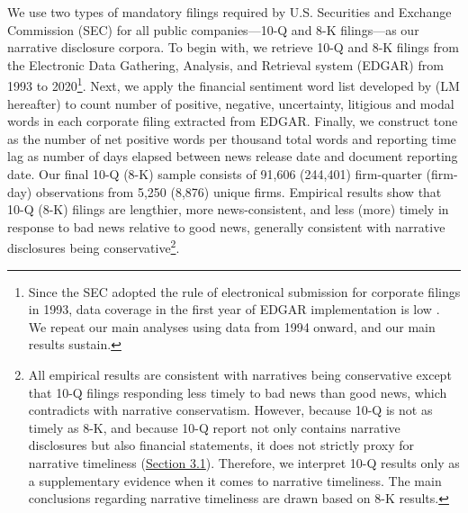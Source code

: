 \documentclass[a4paper]{article}
\begin{document}
\begin{spacing}{2}
We use two types of mandatory filings required by U.S. Securities and Exchange Commission (SEC) for all public companies---10-Q and 8-K filings---as our narrative disclosure corpora. To begin with, we retrieve 10-Q and 8-K filings from the Electronic Data Gathering, Analysis, and Retrieval system (EDGAR) from 1993 to 2020\footnote{Since the SEC adopted the rule of electronical submission for corporate filings in 1993, data coverage in the first year of EDGAR implementation is low \citep*{gaoInformingMarketEffect2020}. We repeat our main analyses using data from 1994 onward, and our main results sustain.}. Next, we apply the financial sentiment word list developed by \citet*{loughranWhenLiabilityNot2011} (LM hereafter) to count number of positive, negative, uncertainty, litigious and modal words in each corporate filing extracted from EDGAR. Finally, we construct tone as the number of net positive words per thousand total words and reporting time lag as number of days elapsed between news release date and document reporting date. Our final 10-Q (8-K) sample consists of 91,606 (244,401) firm-quarter (firm-day) observations from 5,250 (8,876) unique firms. Empirical results show that 10-Q (8-K) filings are lengthier, more news-consistent, and less (more) timely in response to bad news relative to good news, generally consistent with narrative disclosures being conservative\footnote{All empirical results are consistent with narratives being conservative except that 10-Q filings responding less timely to bad news than good news, which contradicts with narrative conservatism. However, because 10-Q is not as timely as 8-K, and because 10-Q report not only contains narrative disclosures but also financial statements, it does not strictly proxy for narrative timeliness (\hyperref[sec3.1]{Section 3.1}). Therefore, we interpret 10-Q results only as a supplementary evidence when it comes to narrative timeliness. The main conclusions regarding narrative timeliness are drawn based on 8-K results.}. 



\end{spacing}
\end{document}
